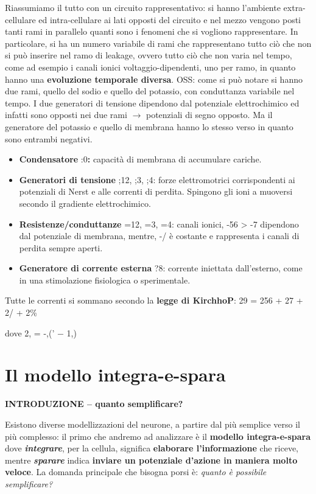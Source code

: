 Riassumiamo il tutto con un circuito rappresentativo: si hanno l'ambiente extra-cellulare ed intra-cellulare ai lati opposti del circuito e nel mezzo vengono posti tanti rami in parallelo quanti sono i fenomeni che si vogliono
rappresentare. In particolare, si ha un numero variabile di rami che rappresentano tutto ciò che non si può inserire nel ramo di leakage, ovvero tutto ciò che non varia nel tempo, come ad esempio i canali ionici voltaggio-dipendenti, uno per ramo, in quanto hanno una \textbf{evoluzione temporale diversa}.
OSS: come si può notare si hanno due rami, quello del sodio e quello del potassio, con conduttanza variabile nel tempo. I due generatori di tensione dipendono dal potenziale elettrochimico ed infatti sono opposti nei due rami $\rightarrow$ potenziali di segno opposto. Ma il generatore del potassio e quello di membrana hanno lo stesso verso in quanto sono entrambi negativi.

\begin{itemize}
  \item \textbf{Condensatore }:0\textbf{: }capacità di membrana di accumulare cariche.
  \item \textbf{Generatori di tensione };12, ;3, ;4: forze elettromotrici corrispondenti ai potenziali di Nerst e alle correnti di perdita. Spingono gli ioni a muoversi secondo il gradiente elettrochimico.
  \item \textbf{Resistenze/conduttanze }=12, =3, =4: canali ionici, -56 > -7 dipendono dal potenziale di membrana, mentre, -/ è costante e rappresenta i canali di perdita sempre aperti.
  \item \textbf{Generatore di corrente esterna }?8: corrente iniettata dall'esterno, come in una stimolazione fisiologica o sperimentale.
\end{itemize}
Tutte le correnti si sommano secondo la \textbf{legge di KirchhoP}: 29 = 256 + 27 + 2/ + 2\%

dove 2, = -,(' $-$ 1,)

\section{Il modello integra-e-spara}

\textbf{INTRODUZIONE -- quanto semplificare?}

Esistono diverse modellizzazioni del neurone, a partire dal più semplice verso il più complesso: il primo che andremo ad analizzare è il \textbf{modello integra-e-spara }dove \textbf{\textit{integrare}}, per la cellula, significa \textbf{elaborare l'informazione }che riceve, mentre \textbf{\textit{sparare}}\textbf{\textit{ }}indica \textbf{inviare un potenziale d'azione in maniera molto veloce}.
La domanda principale che bisogna porsi è:
\textit{quanto è possibile semplificare?}

